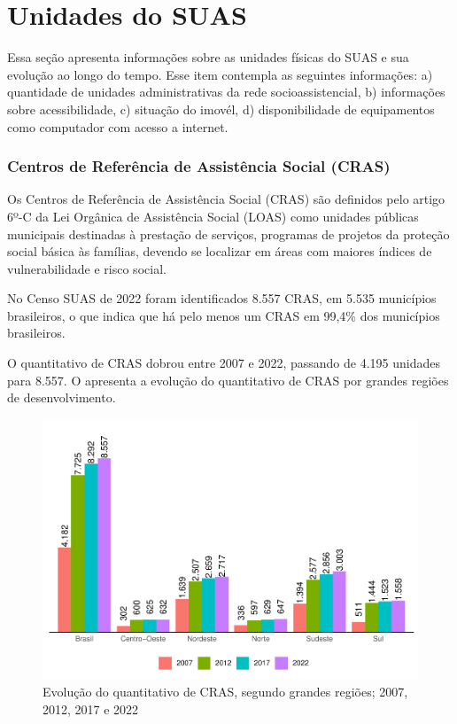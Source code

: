 \documentclass[
  brazilian]{report}
\begin{document}
\hypertarget{unidades-do-suas}{%
\chapter{Unidades do SUAS}\label{unidades-do-suas}}

Essa seção apresenta informações sobre as unidades físicas do SUAS e sua
evolução ao longo do tempo. Esse item contempla as seguintes
informações: a) quantidade de unidades administrativas da rede
socioassistencial, b) informações sobre acessibilidade, c) situação do
imovél, d) disponibilidade de equipamentos como computador com acesso a
internet.

\hypertarget{centros-de-referuxeancia-de-assistuxeancia-social-cras}{%
\subsection{Centros de Referência de Assistência Social
(CRAS)}\label{centros-de-referuxeancia-de-assistuxeancia-social-cras}}

Os Centros de Referência de Assistência Social (CRAS) são definidos pelo
artigo 6º-C da Lei Orgânica de Assistência Social (LOAS) como unidades
públicas municipais destinadas à prestação de serviços, programas de
projetos da proteção social básica às famílias, devendo se localizar em
áreas com maiores índices de vulnerabilidade e risco social.

No Censo SUAS de 2022 foram identificados 8.557 CRAS, em 5.535
municípios brasileiros, o que indica que há pelo menos um CRAS em 99,4\%
dos municípios brasileiros.

O quantitativo de CRAS dobrou entre 2007 e 2022, passando de 4.195
unidades para 8.557. O  apresenta a evolução
do quantitativo de CRAS por grandes regiões de desenvolvimento.

\begin{figure}
\includegraphics{Censo-SUAS-2022_files/figure-latex/quantitativo-CRAS-1} \caption[Evolução do quantitativo de CRAS, segundo grandes regiões]{Evolução do quantitativo de CRAS, segundo grandes regiões; 2007, 2012, 2017 e 2022}\label{fig:quantitativo-CRAS}
\end{figure}
\end{document}
